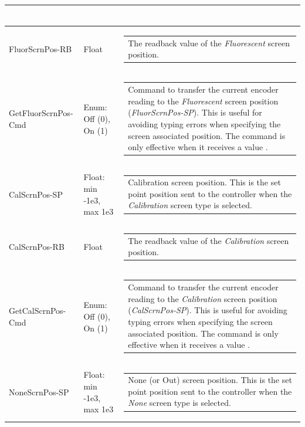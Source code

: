 \documentclass[openany]{article}
\begin{document}
\begin{longtable}{| m{4.5cm} m{2.5cm}  m{7.0cm} |}
\begin{tabular}{@{}m{6cm}@{}}
            \end{tabular} \hypertarget{}{}\\ \hline
        FluorScrnPos-RB & Float & \begin{tabular}{@{}m{6cm}@{}}
                The readback value of the \emph{Fluorescent} screen position.
            \end{tabular} \hypertarget{pv:get-fluor-scrn-pos-cmd}{}\\ \hline
        GetFluorScrnPos-Cmd & Enum: Off (0), On (1) & \begin{tabular}{@{}m{6cm}@{}}
                Command to transfer the current encoder reading to the \emph{Fluorescent} screen position (\emph{FluorScrnPos-SP}). This is useful for avoiding typing errors when specifying the screen associated position. The command is only effective when it receives a value $\neq 0$.
            \end{tabular} \hypertarget{pv:cal-scrn-pos}{}\\ \hline
        CalScrnPos-SP & Float: min -1e3, max 1e3 & \begin{tabular}{@{}m{6cm}@{}}
                Calibration screen position. This is the set point position sent to the controller when the \emph{Calibration} screen type is selected.
            \end{tabular} \hypertarget{}{}\\ \hline
        CalScrnPos-RB & Float & \begin{tabular}{@{}m{6cm}@{}}
                The readback value of the \emph{Calibration} screen position.
            \end{tabular} \hypertarget{pv:get-cal-scrn-pos-cmd}{}\\ \hline
        GetCalScrnPos-Cmd & Enum: Off (0), On (1) & \begin{tabular}{@{}m{6cm}@{}}
                Command to transfer the current encoder reading to the \emph{Calibration} screen position (\emph{CalScrnPos-SP}). This is useful for avoiding typing errors when specifying the screen associated position. The command is only effective when it receives a value $\neq 0$.
            \end{tabular} \hypertarget{pv:none-scrn-pos}{}\\ \hline
        NoneScrnPos-SP & Float: min -1e3, max 1e3 & \begin{tabular}{@{}m{6cm}@{}}
                None (or Out) screen position. This is the set point position sent to the controller when the \emph{None} screen type is selected.

\end{tabular}
\end{longtable}
\end{document}
